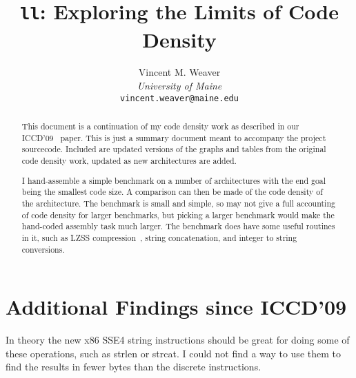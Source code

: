 \documentclass{article}[10pt]
\begin{document}

\title{\LARGE \bf
{\tt ll}: Exploring the Limits of Code Density
}

\author{ \parbox{3 in}{\centering Vincent M. Weaver\\
         \textit{University of Maine}\\
         {\tt vincent.weaver@maine.edu}}
}

\maketitle

\begin{abstract}
This document is a continuation of my code density work as described
in our ICCD'09~\cite{weaver+:iccd09} paper.  
This is just a summary document meant to accompany the project sourcecode.  
Included are updated versions of the graphs and tables from the original
code density work, updated as new architectures are added.

I hand-assemble a simple benchmark on a number of architectures with
the end goal being the smallest code size.  
A comparison can then be made of the code density of the architecture.  
The benchmark is small and simple, so may not give a full accounting of 
code density for larger benchmarks, but picking a larger benchmark would 
make the hand-coded assembly task much larger.  
The benchmark does have some useful routines in it, such as 
LZSS compression~\cite{ziv+:lz77,storer+:lzss82}, 
string concatenation, and integer to string conversions.

\end{abstract}

\section{Additional Findings since ICCD'09}

In theory the new x86 SSE4 string instructions should be great for
doing some of these operations, such as strlen or strcat.
I could not find a way to use them to find the results in fewer
bytes than the discrete instructions.
\end{document}
